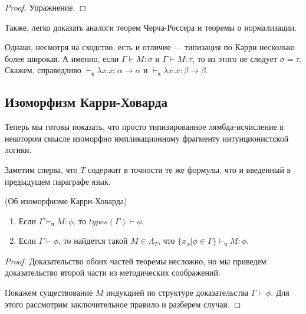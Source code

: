 \begin{proof}
Упражнение.
\end{proof}

Также, легко доказать аналоги теорем Черча-Россера и теоремы о нормализации.

Однако, несмотря на сходство, есть и отличие --- типизация по Карри несколько более
широкая. А именно, если $\Gamma\vdash M:\sigma$ и $\Gamma\vdash M:\tau$, 
то из этого не следует $\sigma=\tau$. Скажем, справедливо
$\vdash_\texttt{к}\lambda x.x : \alpha\rightarrow\alpha$ и 
$\vdash_\texttt{к}\lambda x.x : \beta\rightarrow\beta$.

\subsection{Изоморфизм Карри-Ховарда}

Теперь мы готовы показать, что просто типизированное лямбда-исчисление в некотором
смысле изоморфно импликационному фрагменту интуиционистской логики.

Заметим сперва, что $T$ содержит в точности те же формулы, что и введенный в предыдущем
параграфе язык.
                 
\begin{theorem}(Об изоморфизме Карри-Ховарда)
\begin{enumerate}
\item Если $\Gamma \vdash_\texttt{ч} M:\phi$, то $types(\Gamma) \vdash \phi$.
\item Если $\Gamma \vdash \phi$, то найдется такой $M \in \Lambda_T$, что
$\{x_\phi | \phi\in\Gamma\}\vdash_\texttt{ч} M:\phi$.
\end{enumerate}
\end{theorem}

\begin{proof}
Доказательство обоих частей теоремы несложно, но мы приведем доказательство второй части
из методических соображений.

Покажем существование $M$ индукцией по структуре доказательства $\Gamma\vdash\phi$.
Для этого рассмотрим заключительное правило и разберем случаи.

\end{proof}

